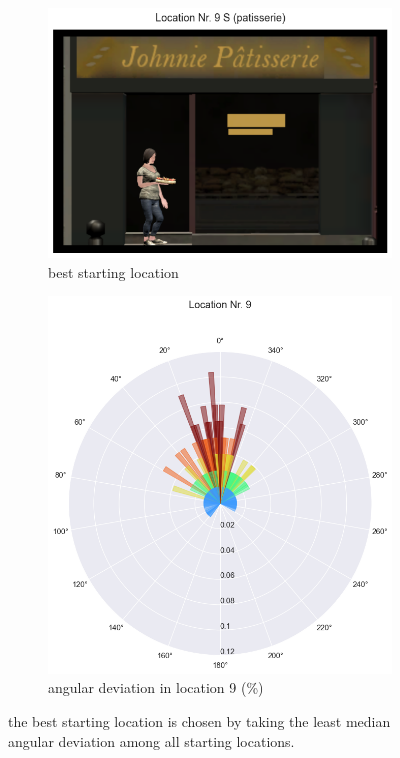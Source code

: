 \begin{figure}[h!]
	\centering
	\begin{subfigure}[b]{0.48\linewidth}
		\includegraphics[width=\linewidth]{figures/best_loc_angular_error_withHA_23.png}
		\caption{best starting location}
		\label{fig:best_angular}
	\end{subfigure}
	\begin{subfigure}[b]{0.48\linewidth}
		\includegraphics[width=\linewidth]{figures/deviation_degrees_loc_nr_9_23.png}
		\caption{angular deviation in location 9 (\%)}
		\label{fig:best_angular_dist_9}
	\end{subfigure}
	
	\caption[Best starting locations based on angular deviation]{the best starting location is chosen by taking the least median angular deviation among all starting locations.}
\end{figure}
\label{fig:best_location}

